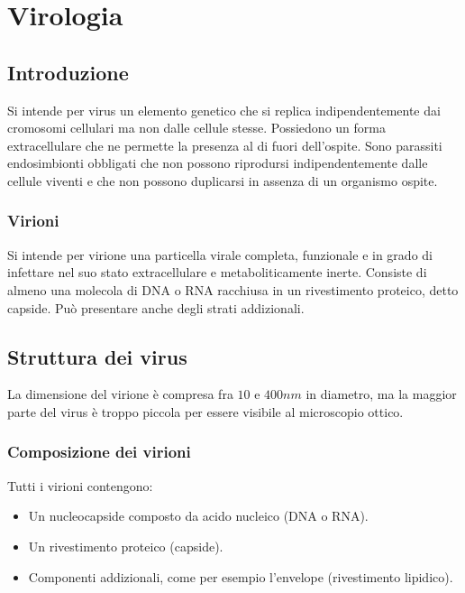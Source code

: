 \chapter{Virologia}

\section{Introduzione}
Si intende per virus un elemento genetico che si replica indipendentemente dai cromosomi cellulari ma non dalle cellule stesse.
Possiedono un forma extracellulare che ne permette la presenza al di fuori dell'ospite.
Sono parassiti endosimbionti obbligati che non possono riprodursi indipendentemente dalle cellule viventi e che non possono duplicarsi in assenza di un organismo ospite.

	\subsection{Virioni}
	Si intende per virione una particella virale completa, funzionale e in grado di infettare nel suo stato extracellulare e metaboliticamente inerte.
	Consiste di almeno una molecola di DNA o RNA racchiusa in un rivestimento proteico, detto capside. 
	Pu\`o presentare anche degli strati addizionali. 

\section{Struttura dei virus}
La dimensione del virione \`e compresa fra $10$ e $400\si{nm}$ in diametro, ma la maggior parte del virus \`e troppo piccola per essere visibile al microscopio ottico.

	\subsection{Composizione dei virioni}
	Tutti i virioni contengono:
	\begin{multicols}{2}
		\begin{itemize}
    			\item Un nucleocapside composto da acido nucleico (DNA o RNA).
    			\item Un rivestimento proteico (capside).
    			\item Componenti addizionali, come per esempio l'envelope (rivestimento lipidico).
		\end{itemize}
	\end{multicols}	


